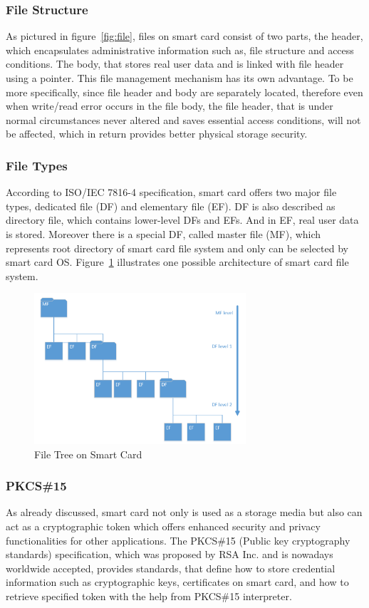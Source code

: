 \subsubsection{File Structure}
As pictured in figure~\ref{fig:file}, files on smart card consist of two parts,  the header, which encapsulates administrative information such as, file structure and access conditions. The body, that stores real user data and is linked with file header using a pointer. This file management mechanism has its own advantage. To be more specifically, since file header and body are separately located, therefore even when write/read error occurs in the file body, the file header, that is under normal circumstances never altered and saves essential access conditions, will not be affected, which in return provides better physical storage security.

\subsubsection{File Types}
According to ISO/IEC 7816-4 specification, smart card offers two major file types, dedicated file (DF) and elementary file (EF). DF is also described as directory file, which contains lower-level DFs and EFs. And in EF, real user data is stored. Moreover there is a special DF, called master file (MF), which represents root directory of smart card file system and only can be selected by smart card OS. Figure~\ref{fig:file-structure} illustrates one possible architecture of smart card file system.

\begin{figure}[!htbp]
	\centering
	\includegraphics[width=0.7\textwidth]{file-structure}
		\caption{File Tree on Smart Card\cite{handbuch}}
	\label{fig:file-structure}
\end{figure}

\subsubsection{PKCS{\#}15}
As already discussed, smart card not only is used as a storage media but also can act as a cryptographic token which offers enhanced security and privacy functionalities for other applications. The PKCS\#15 (Public key cryptography standards) specification\cite{pkcs}, which was proposed by RSA Inc. and is nowadays worldwide accepted, provides standards, that define how to store credential information such as cryptographic keys, certificates on smart card, and how to retrieve specified token with the help from PKCS\#15 interpreter.
 
